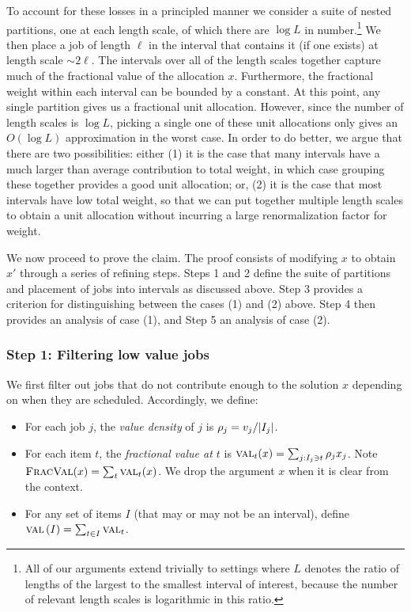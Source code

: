 To account for these losses in a principled manner we consider a suite
of nested partitions, one at each length scale, of which there are
$\log L$ in number.\footnote{All of our arguments extend trivially to
  settings where $L$ denotes the ratio of lengths of the largest to the smallest
  interval of interest, because the number of relevant length scales
  is logarithmic in this ratio.} We then place a job of length $\ell$ in the interval that contains it (if one exists) at length scale $\sim 2\ell$. The intervals over all of the length scales together capture much of the fractional value of the allocation $x$. Furthermore, the fractional weight within each interval can be bounded by a constant. At this point, any single partition gives us a fractional unit allocation. However, since the number of length scales is $\log L$, picking a single one of these unit allocations only gives an $O(\log L)$ approximation in the worst case. In order to do better, we argue that there are two possibilities: either (1) it is the case that many intervals have a much larger than average contribution to total weight, in which case grouping these together provides a good unit allocation; or, (2) it is the case that most intervals have low total weight, so that we can put together multiple length scales to obtain a unit allocation without incurring a large renormalization factor for weight.

We now proceed to prove the claim. The proof consists of modifying $x$ to obtain $x'$ through a series of refining steps. Steps 1 and 2 define the suite of partitions and placement of jobs into intervals as discussed above. Step 3 provides a criterion for distinguishing between the cases (1) and (2) above. Step 4 then provides an analysis of case (1), and Step 5 an analysis of case (2).

\subsubsection*{Step 1: Filtering low value jobs}

We first filter out jobs that do not contribute enough to the solution $x$ depending on when they are scheduled. Accordingly, we define:
\begin{itemize}
    \item For each job $j$, the {\em value density} of $j$ is $\rho_{j} = v_j/|I_j|$.
    \item For each item $t$, the {\em fractional value at $t$} is $\textsc{val}_{t}(x) =
      \sum_{j : I_j \ni t} \rho_{j} x_j$.  Note ${\normalfont\textsc{FracVal}}(x) = \sum_t\textsc{val}_{t}(x)$. We drop the argument $x$ when it is clear from the context.
    \item For any set of items $I$ (that may or may not be an interval), define $\textsc{val}\left(I\right) = \sum_{t \in I}\textsc{val}_{t}$.
\end{itemize}

